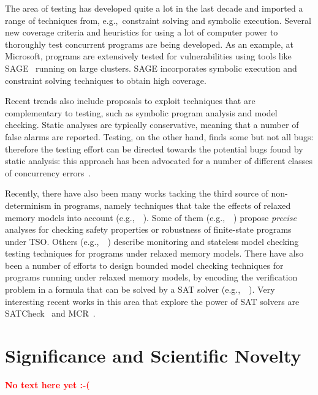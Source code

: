 \documentclass[11pt]{article}
\newcommand{\FIX}[1]{\textcolor{red}{\textbf{#1}}}
\newcommand{\system}[1]{\mbox{\textsf{#1}}}
\newcommand{\eg}{e.\/g.,\ }
\begin{document}
{The area of testing has developed quite a lot in the last decade and
imported a range of techniques from, \eg constraint solving and
symbolic execution. Several new coverage criteria and heuristics for
using a lot of computer power to thoroughly test concurrent programs
are being developed. As an example, at Microsoft, programs are
extensively tested for vulnerabilities using tools like
\system{SAGE}~\cite{SAGE@CACM-12} running on large clusters.
\system{SAGE} incorporates symbolic execution and constraint solving
techniques to obtain high coverage.

Recent trends also include proposals to exploit techniques that are
complementary to testing, such as symbolic program analysis and model
checking. Static analyses are typically conservative, meaning that a
number of false alarms are reported. Testing, on the other hand, finds
some but not all bugs: therefore the testing effort can be directed
towards the potential bugs found by static analysis: this approach has
been advocated for a number of different classes of concurrency
errors~\cite{Sen:pldi08,JNPS:cav09}.

Recently, there have also been many works tacking the third source of
non-determinism in programs, namely techniques that take the effects of
relaxed memory models into account (\eg~\cite{BAM07,BM08,AlglaveM11,LNPVY12,BurnimSS11,BouajjaniDM13,ZhangKW@PLDI-15,SATCheck@OOPSLA-15,MCR-TSO@OOPSLA-16}). Some
of them (\eg~\cite{BouajjaniDM13}) propose \emph{precise} analyses
for checking safety properties or robustness of finite-state programs
under TSO.  Others (\eg~\cite{BM08,BurnimSS11,LNPVY12}) describe
monitoring and stateless model checking testing techniques for
programs under relaxed memory models.  There have also been a number of
efforts to design bounded model checking techniques for programs running
under relaxed memory models, by encoding the verification problem in a
formula that can be solved by a SAT solver (\eg~\cite{BAM07,AlglaveKT13,MCR-TSO@OOPSLA-16}).
%
Very interesting recent works in this area that explore the power
of SAT solvers are SATCheck~\cite{SATCheck@OOPSLA-15} and
MCR~\cite{MCR@PLDI-15,MCR-TSO@OOPSLA-16}.
}


\section{Significance and Scientific Novelty} \label{sec:significance}
\FIX{No text here yet :-(}
\end{document}
